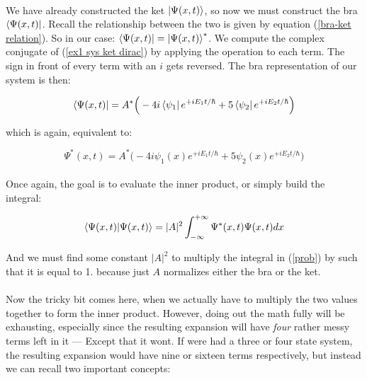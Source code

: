 \documentclass[12pt,letterpaper]{book}
\begin{document}
\paragraph*{}We have already constructed the ket $\ket{\Psi(x,t)}$, so now we must construct the bra $\bra{\Psi(x,t)}$. Recall the relationship between the two is given by equation (\ref{bra-ket relation}). So in our case: $\bra{\Psi(x,t)} = \ket{\Psi(x,t)}^*$. We compute the complex conjugate of (\ref{ex1 sys ket dirac}) by applying the operation to each term. The sign in front of every term with an $i$ gets reversed. The bra representation of our system is then:

\begin{equation}
\label{ex1 sys bra dirac}
\bra{\Psi(x,t)} = A^* \Big( - 4i \bra{\psi_1}e^{+iE_1t/\hbar} + 5 \bra{\psi_2} e^{+iE_2t/\hbar} \Big)
\end{equation}

which is again, equivalent to:

\begin{equation}
\label{ex1 sys non-dirac}
\Psi^*(x,t) = A^* \Big( - 4i \psi_1(x)e^{+iE_1t/\hbar} + 5 \psi_2(x) e^{+iE_2t/\hbar} \Big)
\end{equation}

\paragraph*{}Once again, the goal is to evaluate the inner product, or simply build the integral:

\begin{equation}
\label{prob}
\braket{\Psi(x,t)}{\Psi(x,t)} = |A|^2 \int_{-\infty}^{+\infty} \Psi^*(x,t)\Psi(x,t) dx
\end{equation}

And we must find some constant $|A|^2$ to multiply the integral in (\ref{prob}) by such that it is equal to 1. because just $A$ normalizes either the bra or the ket.

\paragraph*{}Now the tricky bit comes here, when we actually have to multiply the two values together to form the inner product. However, doing out the math fully will be exhausting, especially since the resulting expansion will have \textit{four} rather messy terms left in it --- Except that it wont. If were had a three or four state system, the resulting expansion would have nine or sixteen terms respectively, but instead we can recall two important concepts:
\end{document}
